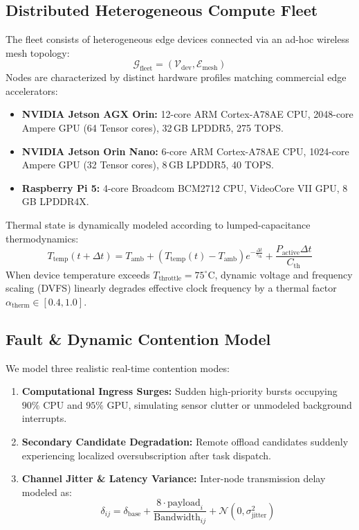 \documentclass[10pt,conference]{IEEEtran}
\begin{document}
\subsection{Distributed Heterogeneous Compute Fleet}
The fleet consists of heterogeneous edge devices connected via an ad-hoc wireless mesh topology:
\begin{equation}
    \mathcal{G}_{\text{fleet}} = (\mathcal{V}_{\text{dev}}, \mathcal{E}_{\text{mesh}})
\end{equation}
Nodes are characterized by distinct hardware profiles matching commercial edge accelerators:
\begin{itemize}
    \item \textbf{NVIDIA Jetson AGX Orin:} 12-core ARM Cortex-A78AE CPU, 2048-core Ampere GPU (64 Tensor cores), 32\,GB LPDDR5, 275 TOPS.
    \item \textbf{NVIDIA Jetson Orin Nano:} 6-core ARM Cortex-A78AE CPU, 1024-core Ampere GPU (32 Tensor cores), 8\,GB LPDDR5, 40 TOPS.
    \item \textbf{Raspberry Pi 5:} 4-core Broadcom BCM2712 CPU, VideoCore VII GPU, 8\,GB LPDDR4X.
\end{itemize}

Thermal state is dynamically modeled according to lumped-capacitance thermodynamics:
\begin{equation}
    T_{\text{temp}}(t + \Delta t) = T_{\text{amb}} + (T_{\text{temp}}(t) - T_{\text{amb}}) e^{-\frac{\Delta t}{\tau_{\text{th}}}} + \frac{P_{\text{active}} \Delta t}{C_{\text{th}}}
\end{equation}
When device temperature exceeds $T_{\text{throttle}} = 75^\circ$C, dynamic voltage and frequency scaling (DVFS) linearly degrades effective clock frequency by a thermal factor $\alpha_{\text{therm}} \in [0.4, 1.0]$.

\subsection{Fault & Dynamic Contention Model}
We model three realistic real-time contention modes:
\begin{enumerate}
    \item \textbf{Computational Ingress Surges:} Sudden high-priority bursts occupying $90\%\text{ CPU}$ and $95\%\text{ GPU}$, simulating sensor clutter or unmodeled background interrupts.
    \item \textbf{Secondary Candidate Degradation:} Remote offload candidates suddenly experiencing localized oversubscription after task dispatch.
    \item \textbf{Channel Jitter & Latency Variance:} Inter-node transmission delay modeled as:
    \begin{equation}
        \delta_{ij} = \delta_{\text{base}} + \frac{8 \cdot \text{payload}_i}{\text{Bandwidth}_{ij}} + \mathcal{N}(0, \sigma_{\text{jitter}}^2)
    \end{equation}
\end{enumerate}
\end{document}
